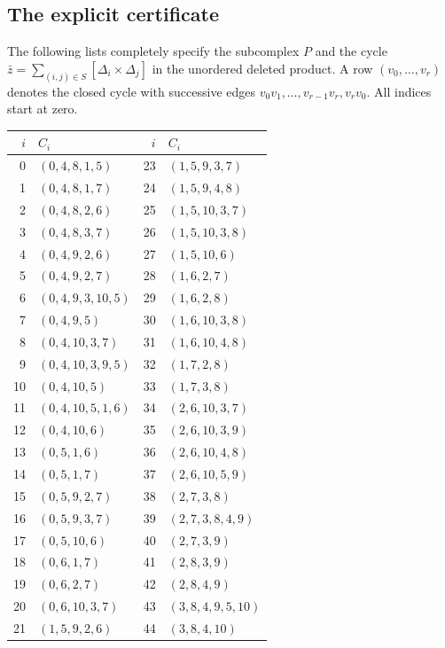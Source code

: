 \documentclass[11pt]{article}
\begin{document}
\begin{appendices}
\section{The explicit certificate}\label{app:certificate}
The following lists completely specify the subcomplex $P$ and the cycle
$\bar z=\sum_{(i,j)\in S}[\Delta_i\times \Delta_j]$ in the unordered deleted product.
A row $(v_0,\ldots,v_r)$ denotes the closed cycle with successive edges
$v_0v_1,\ldots,v_{r-1}v_r,v_rv_0$. All indices start at zero.
\begin{center}\small
\begin{tabular}{r l @{\qquad} r l}
$i$ & $C_i$ & $i$ & $C_i$\\\hline
0 & $(0,4,8,1,5)$ & 23 & $(1,5,9,3,7)$\\
1 & $(0,4,8,1,7)$ & 24 & $(1,5,9,4,8)$\\
2 & $(0,4,8,2,6)$ & 25 & $(1,5,10,3,7)$\\
3 & $(0,4,8,3,7)$ & 26 & $(1,5,10,3,8)$\\
4 & $(0,4,9,2,6)$ & 27 & $(1,5,10,6)$\\
5 & $(0,4,9,2,7)$ & 28 & $(1,6,2,7)$\\
6 & $(0,4,9,3,10,5)$ & 29 & $(1,6,2,8)$\\
7 & $(0,4,9,5)$ & 30 & $(1,6,10,3,8)$\\
8 & $(0,4,10,3,7)$ & 31 & $(1,6,10,4,8)$\\
9 & $(0,4,10,3,9,5)$ & 32 & $(1,7,2,8)$\\
10 & $(0,4,10,5)$ & 33 & $(1,7,3,8)$\\
11 & $(0,4,10,5,1,6)$ & 34 & $(2,6,10,3,7)$\\
12 & $(0,4,10,6)$ & 35 & $(2,6,10,3,9)$\\
13 & $(0,5,1,6)$ & 36 & $(2,6,10,4,8)$\\
14 & $(0,5,1,7)$ & 37 & $(2,6,10,5,9)$\\
15 & $(0,5,9,2,7)$ & 38 & $(2,7,3,8)$\\
16 & $(0,5,9,3,7)$ & 39 & $(2,7,3,8,4,9)$\\
17 & $(0,5,10,6)$ & 40 & $(2,7,3,9)$\\
18 & $(0,6,1,7)$ & 41 & $(2,8,3,9)$\\
19 & $(0,6,2,7)$ & 42 & $(2,8,4,9)$\\
20 & $(0,6,10,3,7)$ & 43 & $(3,8,4,9,5,10)$\\
21 & $(1,5,9,2,6)$ & 44 & $(3,8,4,10)$\\

\end{tabular}
\end{center}
\end{appendices}
\end{document}
